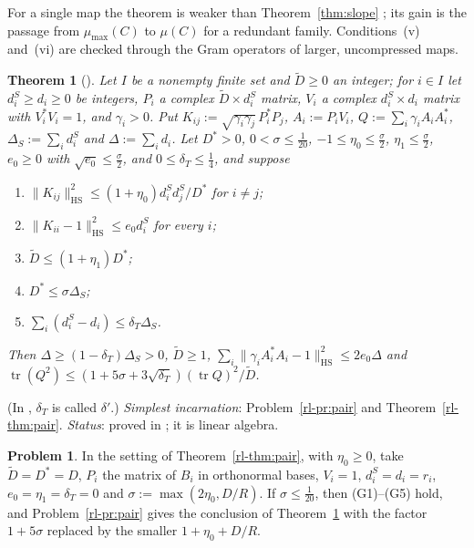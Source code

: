 \documentclass[reqno]{amsart}
\theoremstyle{definition}
\newtheorem{problem}{Problem}[section]
\theoremstyle{plain}
\newtheorem{theorem}{Theorem}[section]
\newcommand{\mumax}{\mu_{\max}}
\newcommand{\tr}{\operatorname{tr}}
\newcommand{\HS}{\mathrm{HS}}
\newcommand{\dS}{d^{S}}
\begin{document}
For a single map the theorem is weaker than Theorem~\ref{thm:slope} \cite[Rem.~13.9]{Adr}; its gain is the passage from \(\mumax(C)\) to \(\mu(C)\) for a redundant family.  Conditions~(v) and~(vi) are checked through the Gram operators of larger, uncompressed maps.

\begin{theorem}[{\cite[Prop.~13.11]{Adr}}]\label{thm:gram}
Let \(I\) be a nonempty finite set and \(\tilde D \ge 0\) an integer; for \(i \in I\) let \(\dS_i \ge d_i \ge 0\) be integers, \(P_i\) a complex \(\tilde D \times \dS_i\) matrix, \(V_i\) a complex \(\dS_i \times d_i\) matrix with \(V_i^*V_i = 1\), and \(\gamma_i > 0\).  Put \(K_{ij} := \sqrt{\gamma_i\gamma_j}\,P_i^*P_j\), \(A_i := P_iV_i\), \(Q := \sum_i \gamma_iA_iA_i^*\), \(\Delta_S := \sum_i \dS_i\) and \(\Delta := \sum_i d_i\).  Let \(D^* > 0\), \(0 < \sigma \le \frac1{20}\), \(-1 \le \eta_0 \le \frac\sigma2\), \(\eta_1 \le \frac\sigma2\), \(e_0 \ge 0\) with \(\sqrt{e_0} \le \frac\sigma2\), and \(0 \le \delta_T \le \frac14\), and suppose
\begin{enumerate}
\item[(G1)] \(\lVert K_{ij}\rVert_\HS^2 \le (1 + \eta_0)\dS_i\dS_j/D^*\) for \(i \ne j\);
\item[(G2)] \(\lVert K_{ii} - 1\rVert_\HS^2 \le e_0\dS_i\) for every \(i\);
\item[(G3)] \(\tilde D \le (1 + \eta_1)D^*\);
\item[(G4)] \(D^* \le \sigma\Delta_S\);
\item[(G5)] \(\sum_i (\dS_i - d_i) \le \delta_T\Delta_S\).
\end{enumerate}
Then \(\Delta \ge (1 - \delta_T)\Delta_S > 0\), \(\tilde D \ge 1\), \(\sum_i \lVert\gamma_iA_i^*A_i - 1\rVert_\HS^2 \le 2e_0\Delta\) and \(\tr(Q^2) \le (1 + 5\sigma + 3\sqrt{\delta_T})(\tr Q)^2/\tilde D\).
\end{theorem}

(In \cite{Adr}, \(\delta_T\) is called \(\delta'\).)  \emph{Simplest incarnation}: Problem~\ref{rl-pr:pair} and Theorem~\ref{rl-thm:pair}.  \emph{Status}: proved in \cite{Adr}; it is linear algebra.

\begin{problem}\label{pr:pair}
In the setting of Theorem~\ref{rl-thm:pair}, with \(\eta_0 \ge 0\), take \(\tilde D = D^* = D\), \(P_i\) the matrix of \(B_i\) in orthonormal bases, \(V_i = 1\), \(\dS_i = d_i = r_i\), \(e_0 = \eta_1 = \delta_T = 0\) and \(\sigma := \max(2\eta_0, D/R)\).  If \(\sigma \le \frac1{20}\), then (G1)--(G5) hold, and Problem~\ref{rl-pr:pair} gives the conclusion of Theorem~\ref{thm:gram} with the factor \(1 + 5\sigma\) replaced by the smaller \(1 + \eta_0 + D/R\).
\end{problem}
\end{document}

